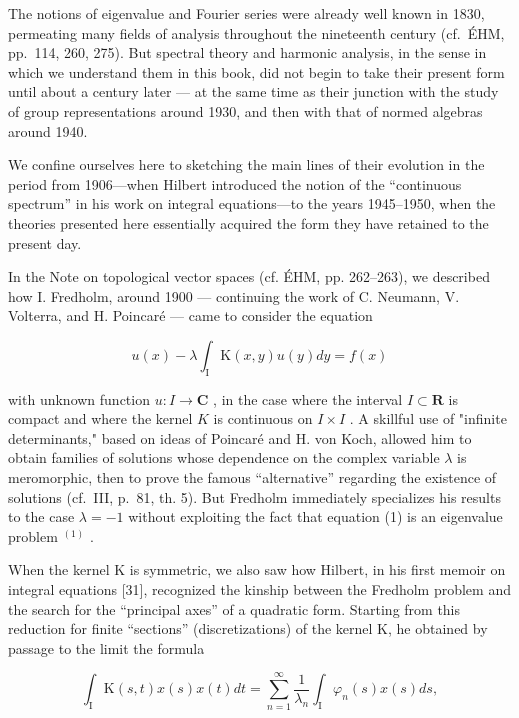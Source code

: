 The notions of eigenvalue and Fourier series were already well known in 1830, permeating many fields of analysis throughout the nineteenth century (cf.~ÉHM, pp.~114, 260, 275). But spectral theory and harmonic analysis, in the sense in which we understand them in this book, did not begin to take their present form until about a century later --- at the same time as their junction with the study of group representations around 1930, and then with that of normed algebras around 1940.

We confine ourselves here to sketching the main lines of their evolution in the period from 1906—when Hilbert introduced the notion of the “continuous spectrum” in his work on integral equations—to the years 1945–1950, when the theories presented here essentially acquired the form they have retained to the present day.


In the Note on topological vector spaces (cf. ÉHM, pp. 262–263), we described how I. Fredholm, around 1900 — continuing the work of C. Neumann, V. Volterra, and H. Poincaré — came to consider the equation

\[
u (x) - \lambda \int_ {\mathrm{I}} \mathrm{K} (x, y) u (y) d y = f (x)\tag{1}
\]

with unknown function \(u\colon I\to\mathbf{C}\) , in the case where the interval \(I\subset\mathbf{R}\) is compact and where the kernel \(K\) is continuous on \(I\times I\) . A skillful use of "infinite determinants," based on ideas of Poincaré and H. von Koch, allowed him to obtain families of solutions whose dependence on the complex variable \(\lambda\) is meromorphic, then to prove the famous “alternative” regarding the existence of solutions (cf.~III, p.~81, th. 5). But Fredholm immediately specializes his results to the case \(\lambda = -1\) without exploiting the fact that equation (1) is an eigenvalue problem \(^{(1)}\) .

When the kernel K is symmetric, we also saw how Hilbert, in his first memoir on integral equations [31], recognized the kinship between the Fredholm problem and the search for the “principal axes” of a quadratic form. Starting from this reduction for finite “sections” (discretizations) of the kernel K, he obtained by passage to the limit the formula

\[
\int_ {\mathrm{I}} \mathrm{K} (s, t) x (s) x (t) d t = \sum_ {n = 1} ^ {\infty} \frac {1}{\lambda_ {n}} \int_ {\mathrm{I}} \varphi_ {n} (s) x (s) d s,\tag{2}
\]

